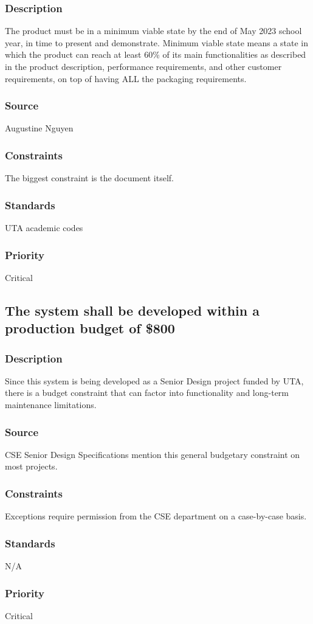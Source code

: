 \subsubsection{Description}
The product must be in a minimum viable state by the end of May 2023 school year, in time to present and demonstrate.  Minimum viable state means a state in which the product can reach at least 60\% of its main functionalities as described in the product description, performance requirements, and other customer requirements, on top of having ALL the packaging requirements.
\subsubsection{Source}
Augustine Nguyen
\subsubsection{Constraints}
The biggest constraint is the document itself.
\subsubsection{Standards}
UTA academic codes
\subsubsection{Priority}
Critical

\subsection{The system shall be developed within a production budget of \$800}
\subsubsection{Description}
Since this system is being developed as a Senior Design project funded by UTA, there is a budget constraint that can factor into functionality and long-term maintenance limitations.
\subsubsection{Source}
CSE Senior Design Specifications mention this general budgetary constraint on most projects. 
\subsubsection{Constraints}
Exceptions require permission from the CSE department on a case-by-case basis.
\subsubsection{Standards}
N/A
\subsubsection{Priority}
Critical
